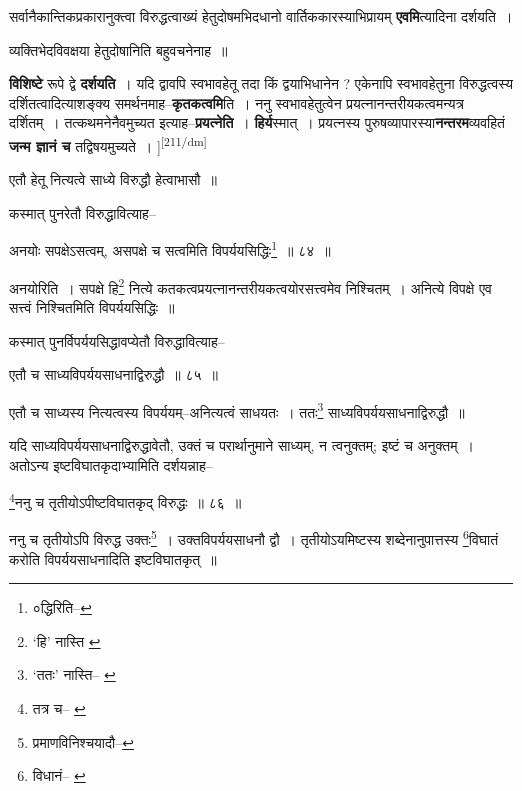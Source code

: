 \documentclass[article,12pt,a4paper]{memoir}
\begin{document}
	  \pstart सर्वानैकान्तिकप्रकारानुक्त्वा विरुद्धत्वाख्यं हेतुदोषमभिदधानो वार्तिककारस्याभिप्रायम् \textbf{एवमि}त्यादिना दर्शयति ।
	\pend
      

	  \pstart व्यक्तिभेदविवक्षया हेतुदोषानिति बहुवचनेनाह ॥
	\pend
      

	  \pstart \textbf{विशिष्टे} रूपे द्वे \textbf{दर्शयति} । यदि द्वावपि स्वभावहेतू तदा किं द्वयाभिधानेन ? एकेनापि स्वभावहेतुना विरुद्धत्वस्य दर्शितत्वादित्याशङ्क्य समर्थनमाह--\textbf{कृतकत्वमि}ति । ननु स्वभावहेतुत्वेन प्रयत्नानन्तरीयकत्वमन्यत्र दर्शितम् । तत्कथमनेनैवमुच्यत इत्याह--\textbf{प्रयत्नेति} । \textbf{हिर्य}स्मात् । प्रयत्नस्य पुरुषव्यापारस्या\textbf{नन्तरम}व्यवहितं \textbf{जन्म ज्ञानं च} तद्विषयमुच्यते ।
	\pend
      [[चेति \cite{dp-msC}]]\leavevmode\textsuperscript{\rmlatinfont\tiny [211/dm]}

	  \pstart एतौ हेतू नित्यत्वे साध्ये विरुद्धौ हेत्वाभासौ ॥
	\pend
       

	  \pstart कस्मात् पुनरेतौ विरुद्धावित्याह--
	\pend
       

	  \pstart अनयोः सपक्षेऽसत्वम्, असपक्षे च सत्वमिति विपर्ययसिद्धिः\footnote{०द्धिरिति--\cite{dp-msC}} ॥ ८४ ॥
	\pend
       

	  \pstart अनयोरिति । सपक्षे हि\footnote{‘हि’ नास्ति \cite{dp-msA} \cite{dp-msB} \cite{dp-edP} \cite{dp-edH} \cite{dp-edE} \cite{dp-edN}} नित्ये कतकत्वप्रयत्नानन्तरीयकत्वयोरसत्त्वमेव निश्चितम् । अनित्ये विपक्षे एव सत्त्वं निश्चितमिति विपर्ययसिद्धिः ॥
	\pend
       

	  \pstart कस्मात् पुनर्विपर्ययसिद्धावप्येतौ विरुद्धावित्याह--
	\pend
       

	  \pstart एतौ च साध्यविपर्ययसाधनाद्विरुद्धौ ॥ ८५ ॥
	\pend
       

	  \pstart एतौ च साध्यस्य नित्यत्वस्य विपर्ययम्--अनित्यत्वं साधयतः । ततः\footnote{‘ततः’ नास्ति--\cite{dp-msA} \cite{dp-msB} \cite{dp-edP} \cite{dp-edH} \cite{dp-edN}} साध्यविपर्ययसाधनाद्विरुद्धौ ॥
	\pend
       

	  \pstart यदि साध्यविपर्ययसाधनाद्विरुद्धावेतौ, उक्तं च परार्थानुमाने साध्यम्, न त्वनुक्तम्; इष्टं च अनुक्तम् । अतोऽन्य इष्टविघातकृदाभ्यामिति दर्शयन्नाह--
	\pend
       

	  \pstart \footnote{तत्र च--\cite{dp-msB} \cite{dp-edP} \cite{dp-edH}}ननु च तृतीयोऽपीष्टविघातकृद् विरुद्धः ॥ ८६ ॥
	\pend
       

	  \pstart ननु च तृतीयोऽपि विरुद्ध उक्तः\footnote{प्रमाणविनिश्चयादौ--\cite{dp-msD-n}} । उक्तविपर्ययसाधनौ द्वौ । तृतीयोऽयमिष्टस्य शब्देनानुपात्तस्य \footnote{विधानं--\cite{dp-msA} \cite{dp-msB} \cite{dp-edP} \cite{dp-edH}}विघातं करोति विपर्ययसाधनादिति इष्टविघातकृत् ॥
	\pend
       
\end{document}
